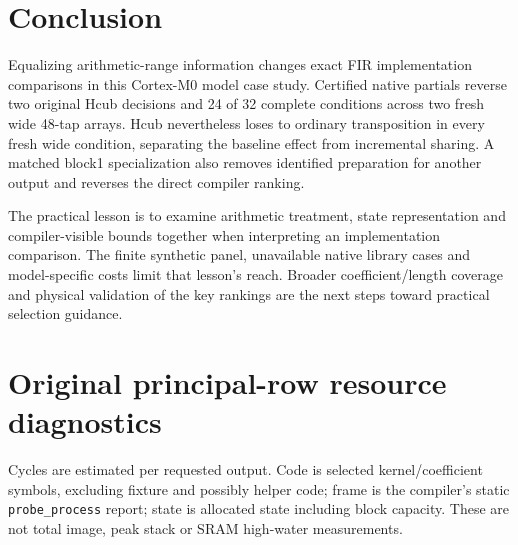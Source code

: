\documentclass[conference]{IEEEtran}
\begin{document}
\section{Conclusion}\label{conclusion}

Equalizing arithmetic-range information changes exact FIR implementation
comparisons in this Cortex-M0 model case study. Certified native
partials reverse two original Hcub decisions and 24 of 32 complete
conditions across two fresh wide 48-tap arrays. Hcub nevertheless loses
to ordinary transposition in every fresh wide condition, separating the
baseline effect from incremental sharing. A matched block1
specialization also removes identified preparation for another output
and reverses the direct compiler ranking.

The practical lesson is to examine arithmetic treatment, state
representation and compiler-visible bounds together when interpreting an
implementation comparison. The finite synthetic panel, unavailable
native library cases and model-specific costs limit that lesson's reach.
Broader coefficient/length coverage and physical validation of the key
rankings are the next steps toward practical selection guidance.

\appendices

\section{Original principal-row resource diagnostics}\label{appendix-a.-original-principal-row-resource-diagnostics}

Cycles are estimated per requested output. Code is selected
kernel/coefficient symbols, excluding fixture and possibly helper code;
frame is the compiler's static \texttt{probe\_process} report; state is
allocated state including block capacity. These are not total image,
peak stack or SRAM high-water measurements.
\end{document}
